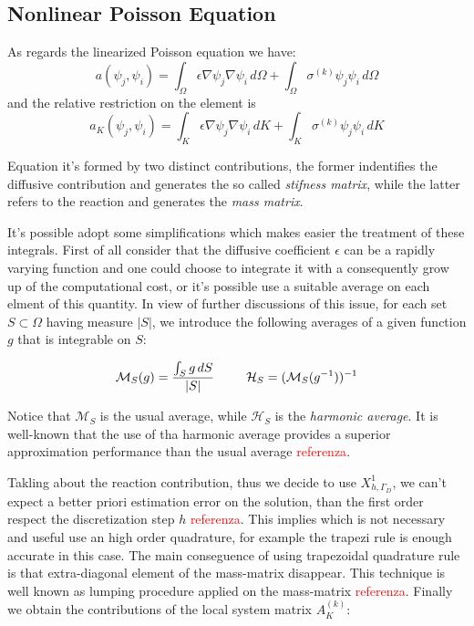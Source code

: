 \subsection{Nonlinear Poisson Equation}


As regards the linearized Poisson equation we have:
\begin{equation}
a(\psi_j,\psi_i)  = \int_{\Omega} \epsilon \nabla \psi_j \nabla \psi_i \, d\Omega + \int_{\Omega} \sigma^{(k)}\psi_j \psi_i \, d\Omega 
\end{equation}
and the relative restriction on the element is
\begin{equation}
\label{eq: bilinear local discrete}
a_K(\psi_j,\psi_i)  = \int_{K} \epsilon \nabla \psi_j \nabla \psi_i \, dK + \int_{K} \sigma^{(k)}\psi_j \psi_i \, dK
\end{equation}

Equation  it's formed by two distinct contributions, the former indentifies the diffusive contribution and generates the so called \textit{stifness matrix}, while the latter refers to the reaction and generates the \textit{mass matrix}.


It's possible adopt some simplifications which makes easier the treatment of these integrals. First of all consider that the diffusive coefficient $\epsilon$ can be a rapidly varying function and one could choose to integrate it with a consequently grow up of the computational cost, or it's possible use a suitable average on each elment of this quantity. In view of further discussions of this issue, for each set $S \subset \Omega$ having measure $|S|$, we introduce the following averages of a given function $g$ that is integrable on $S$:

\begin{equation*}
\mathcal{M}_S(g) = \dfrac{\int_S g \, dS}{|S|} \psp{15} \mathcal{H}_S = (\mathcal{M}_S(g^{-1}))^{-1} 
\end{equation*}

Notice that $\mathcal{M}_S$ is the usual average, while $\mathcal{H}_S$ is the \textit{harmonic average}. It is well-known that the use of tha harmonic average provides a superior approximation performance than the usual average \textcolor{red}{referenza}.

Takling about the reaction contribution, thus we decide to use $X^1_{h,\Gamma_D}$,  we can't expect a better priori estimation error on the solution, than the first order respect the discretization step $h$ \textcolor{red}{referenza}. This implies which is not necessary and useful use an high order quadrature, for example the trapezi rule is enough accurate in this case. 
The main conseguence of using trapezoidal quadrature rule is that extra-diagonal element of the mass-matrix disappear.
This technique is well known as lumping procedure applied on the mass-matrix \textcolor{red}{referenza}.
Finally we obtain the contributions of the local system matrix $A_K^{(k)}$:

